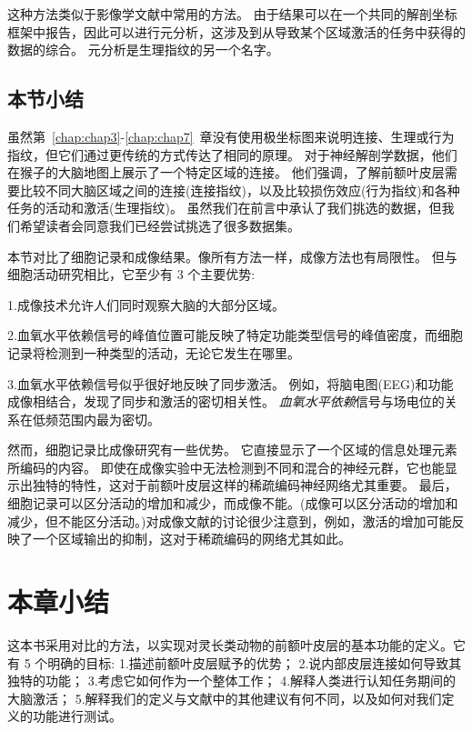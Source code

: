 \par
这种方法类似于影像学文献中常用的方法。
由于结果可以在一个共同的解剖坐标框架中报告，因此可以进行元分析，这涉及到从导致某个区域激活的任务中获得的数据的综合。
元分析是生理指纹的另一个名字。


\subsection{本节小结}

虽然第~\ref{chap:chap3}-\ref{chap:chap7}~章没有使用极坐标图来说明连接、生理或行为指纹，但它们通过更传统的方式传达了相同的原理。
对于神经解剖学数据，他们在猴子的大脑地图上展示了一个特定区域的连接。
他们强调，了解前额叶皮层需要比较不同大脑区域之间的连接(连接指纹)，以及比较损伤效应(行为指纹)和各种任务的活动和激活(生理指纹)。
虽然我们在前言中承认了我们挑选的数据，但我们希望读者会同意我们已经尝试挑选了很多数据集。


\par
本节对比了细胞记录和成像结果。像所有方法一样，成像方法也有局限性。
但与细胞活动研究相比，它至少有 3 个主要优势:
\par 1.成像技术允许人们同时观察大脑的大部分区域。
\par 2.血氧水平依赖信号的峰值位置可能反映了特定功能类型信号的峰值密度，而细胞记录将检测到一种类型的活动，无论它发生在哪里。
\par 3.血氧水平依赖信号似乎很好地反映了同步激活。
例如，将脑电图(EEG)和功能成像相结合\cite{parkes2006combining}，发现了同步和激活的密切相关性。
\textit{血氧水平依赖}信号与场电位的关系在低频范围内最为密切\cite{kayser2004comparison}。


\par 然而，细胞记录比成像研究有一些优势。
它直接显示了一个区域的信息处理元素所编码的内容。
即使在成像实验中无法检测到不同和混合的神经元群，它也能显示出独特的特性，这对于前额叶皮层这样的稀疏编码神经网络尤其重要。
最后，细胞记录可以区分活动的增加和减少，而成像不能。(成像可以区分活动的增加和减少，但不能区分活动。)对成像文献的讨论很少注意到，例如，激活的增加可能反映了一个区域输出的抑制，这对于稀疏编码的网络尤其如此。


\section{本章小结}

这本书采用对比的方法，以实现对灵长类动物的前额叶皮层的基本功能的定义。它有 5 个明确的目标:
1.描述前额叶皮层赋予的优势；
2.说内部皮层连接如何导致其独特的功能；
3.考虑它如何作为一个整体工作；
4.解释人类进行认知任务期间的大脑激活；
5.解释我们的定义与文献中的其他建议有何不同，以及如何对我们定义的功能进行测试。


